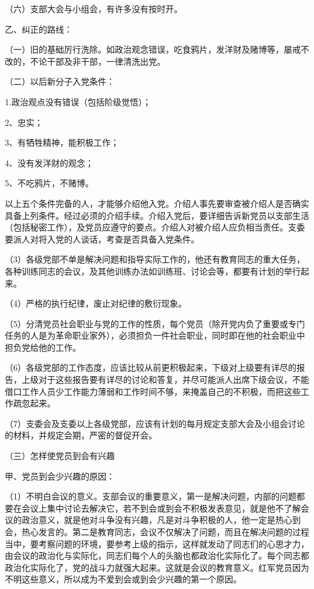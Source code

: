 （六）支部大会与小组会，有许多没有按时开。

乙、纠正的路线：

（一）旧的基础厉行洗除。如政治观念错误，吃食鸦片，发洋财及赌博等，屡戒不改的，不论干部及非干部，一律清洗出党。

（二）以后新分子入党条件：

1.政治观点没有错误（包括阶级觉悟）；

2、忠实；

3、有牺牲精神，能积极工作；

4、没有发洋财的观念；

5、不吃鸦片，不赌博。

以上五个条件完备的人，才能够介绍他入党。介绍人事先要审查被介绍人是否确实具备上列条件。经过必须的介绍手续。介绍入党后，要详细告诉新党员以支部生活（包括秘密工作），及党员应遵守的要点。介绍人对被介绍人应负相当责任。支委要派人对将入党的人谈话，考查是否具备入党条件。

（3）各级党部不单是解决问题和指导实际工作的，他还有教育同志的重大任务，各种训练同志的会议，及其他训练办法如训练班、讨论会等，都要有计划的举行起来。

（4）严格的执行纪律，废止对纪律的敷衍现象。

（5）分清党员社会职业与党的工作的性质，每个党员（除开党内负了重要或专门任务的人是为革命职业家外），必须担负一件社会职业，同时即在他的社会职业中担负党给他的工作。

（6）各级党部的工作态度，应该比较从前更积极起来，下级对上级要有详尽的报告，上级对于这些报告要有详尽的讨论和答复，并尽可能派人出席下级会议，不能借口工作人员少工作能力薄弱和工作时间不够，来掩盖自己的不积极，而把这些工作疏忽起来。

（7）支委会及支委以上各级党部，应该有计划的每月规定支部大会及小组会讨论的材料，并规定会期，严密的督促开会。

（三）怎样使党员到会有兴趣

甲、党员到会少兴趣的原因：

（1）不明白会议的意义。支部会议的重要意义，第一是解决问题，内部的问题都要在会议上集中讨论去解决它，若不到会或到会不积极发表意见，就是他不了解会议的政治意义，就是他对斗争没有兴趣，凡是对斗争积极的人，他一定是热心到会，热心发言的。第二是教育同志，会议不仅解决了问题，而且在解决问题的过程当中，要考察问题的环境，要参考上级的指示，这样就发动了同志们的心思才力，由会议的政治化与实际化，同志们每个人的头脑也都政治化实际化了。每个同志都政治化实际化了，党的战斗力就强大起来。这就是会议的教育意义。红军党员因为不明这些意义，所以成为不爱到会或到会少兴趣的第一个原因。


